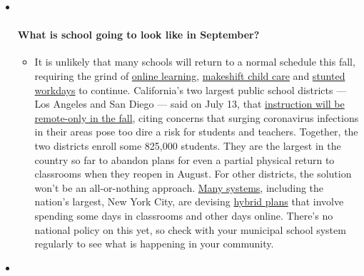 \begin{itemize}
\item ~
  \hypertarget{what-is-school-going-to-look-like-in-september}{%
  \paragraph{What is school going to look like in
  September?}\label{what-is-school-going-to-look-like-in-september}}

  \begin{itemize}
  \tightlist
  \item
    It is unlikely that many schools will return to a normal schedule
    this fall, requiring the grind of
    \href{https://www.nytimes3xbfgragh.onion/2020/06/05/us/coronavirus-education-lost-learning.html?action=click\&pgtype=Article\&state=default\&module=styln-coronavirus-national\&region=MAIN_CONTENT_3\&context=storylines_faq}{online
    learning},
    \href{https://www.nytimes3xbfgragh.onion/2020/05/29/us/coronavirus-child-care-centers.html?action=click\&pgtype=Article\&state=default\&module=styln-coronavirus-national\&region=MAIN_CONTENT_3\&context=storylines_faq}{makeshift
    child care} and
    \href{https://www.nytimes3xbfgragh.onion/2020/06/03/business/economy/coronavirus-working-women.html?action=click\&pgtype=Article\&state=default\&module=styln-coronavirus-national\&region=MAIN_CONTENT_3\&context=storylines_faq}{stunted
    workdays} to continue. California's two largest public school
    districts --- Los Angeles and San Diego --- said on July 13, that
    \href{https://www.nytimes3xbfgragh.onion/2020/07/13/us/lausd-san-diego-school-reopening.html?action=click\&pgtype=Article\&state=default\&module=styln-coronavirus-national\&region=MAIN_CONTENT_3\&context=storylines_faq}{instruction
    will be remote-only in the fall}, citing concerns that surging
    coronavirus infections in their areas pose too dire a risk for
    students and teachers. Together, the two districts enroll some
    825,000 students. They are the largest in the country so far to
    abandon plans for even a partial physical return to classrooms when
    they reopen in August. For other districts, the solution won't be an
    all-or-nothing approach.
    \href{https://bioethics.jhu.edu/research-and-outreach/projects/eschool-initiative/school-policy-tracker/}{Many
    systems}, including the nation's largest, New York City, are
    devising
    \href{https://www.nytimes3xbfgragh.onion/2020/06/26/us/coronavirus-schools-reopen-fall.html?action=click\&pgtype=Article\&state=default\&module=styln-coronavirus-national\&region=MAIN_CONTENT_3\&context=storylines_faq}{hybrid
    plans} that involve spending some days in classrooms and other days
    online. There's no national policy on this yet, so check with your
    municipal school system regularly to see what is happening in your
    community.
  \end{itemize}
\item ~
  \hypertarget{is-the-coronavirus-airborne}{%
}
\end{itemize}
